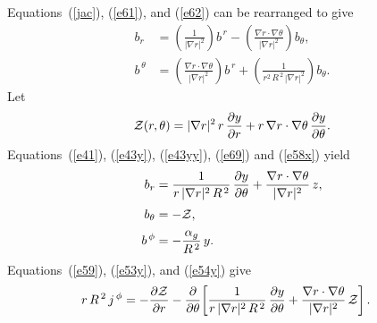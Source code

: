 \documentclass[12pt,prb,aps,notitlepage]{revtex4-1}
\begin{document}
Equations~(\ref{jac}), (\ref{e61}), and (\ref{e62}) can be rearranged to give
\begin{align}
b_r &= \left(\frac{1}{|\nabla r|^2}\right)b^{\,r}- \left(\frac{\nabla r\cdot\nabla\theta}{|\nabla r|^2}\right)b_\theta,\label{e69}\\[0.5ex]
\label{e58x}
b^{\,\theta}& = \left(\frac{\nabla r\cdot\nabla\theta}{|\nabla r|^2}\right)b^{\,r} + \left(\frac{1}{r^2\,R^{\,2}\,|\nabla r|^2}\right) b_\theta.
\end{align}
Let 
\begin{equation}\label{zdef}
{\cal Z}(r,\theta)= |\nabla r|^2\,r\,\frac{\partial y}{\partial r} + r\,\nabla r\cdot\nabla\theta\,\frac{\partial y}{\partial\theta}.
\end{equation}
Equations~(\ref{e41}), (\ref{e43y}), (\ref{e43yy}), (\ref{e69}) and (\ref{e58x}) yield 
\begin{align}\label{e53y}
b_r &=\frac{1}{r\,|\nabla r|^2\,R^{\,2}}\,\frac{\partial y}{\partial \theta} + \frac{\nabla r\cdot\nabla\theta}{|\nabla r|^2}\,z,\\[0.5ex]
b_\theta &= -{\cal Z},\label{e54y}\\[0.5ex]
b^{\,\phi} &= -\frac{\alpha_g}{R^{\,2}}\,y.\label{e55yy}
\end{align}
Equations~(\ref{e59}), (\ref{e53y}), and (\ref{e54y}) give
\begin{align}\label{e56yy}
r\,R^{\,2}\,j^{\,\phi} &=-\frac{\partial {\cal Z}}{\partial r}-\frac{\partial}{\partial\theta}\!\left[\frac{1}{r\,|\nabla r|^2\,R^{\,2}}\,\frac{\partial y}{\partial \theta} + \frac{\nabla r\cdot\nabla\theta}{|\nabla r|^2}\,{\cal Z}\right].
\end{align}
\end{document}
